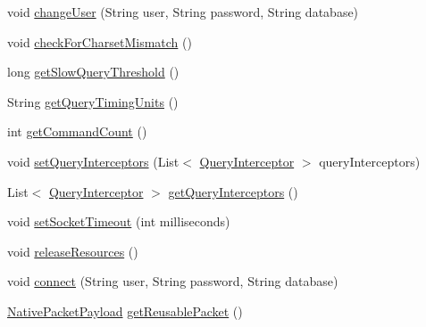 \begin{DoxyCompactItemize}
\item 
void \mbox{\hyperlink{classcom_1_1mysql_1_1cj_1_1protocol_1_1a_1_1_native_protocol_a7f356b98ad856e135cfbdcae35d87009}{change\+User}} (String user, String password, String database)
\item 
void \mbox{\hyperlink{classcom_1_1mysql_1_1cj_1_1protocol_1_1a_1_1_native_protocol_a08c79e079662813e512c6fe30cfb5fdd}{check\+For\+Charset\+Mismatch}} ()
\item 
long \mbox{\hyperlink{classcom_1_1mysql_1_1cj_1_1protocol_1_1a_1_1_native_protocol_a6cea7c094360051de8781b7fe2ea87ae}{get\+Slow\+Query\+Threshold}} ()
\item 
String \mbox{\hyperlink{classcom_1_1mysql_1_1cj_1_1protocol_1_1a_1_1_native_protocol_a64f116119e9dc3ab702d1b15e4a18c54}{get\+Query\+Timing\+Units}} ()
\item 
int \mbox{\hyperlink{classcom_1_1mysql_1_1cj_1_1protocol_1_1a_1_1_native_protocol_ad6bcb856be81eab8d103631d4479dfc8}{get\+Command\+Count}} ()
\item 
void \mbox{\hyperlink{classcom_1_1mysql_1_1cj_1_1protocol_1_1a_1_1_native_protocol_ac90258dbc58a891639d6a2c15c77de67}{set\+Query\+Interceptors}} (List$<$ \mbox{\hyperlink{interfacecom_1_1mysql_1_1cj_1_1interceptors_1_1_query_interceptor}{Query\+Interceptor}} $>$ query\+Interceptors)
\item 
List$<$ \mbox{\hyperlink{interfacecom_1_1mysql_1_1cj_1_1interceptors_1_1_query_interceptor}{Query\+Interceptor}} $>$ \mbox{\hyperlink{classcom_1_1mysql_1_1cj_1_1protocol_1_1a_1_1_native_protocol_ad86ce2b8286a798c9408508217fb908b}{get\+Query\+Interceptors}} ()
\item 
void \mbox{\hyperlink{classcom_1_1mysql_1_1cj_1_1protocol_1_1a_1_1_native_protocol_ab6cb784afa306e310da731783c3ff602}{set\+Socket\+Timeout}} (int milliseconds)
\item 
void \mbox{\hyperlink{classcom_1_1mysql_1_1cj_1_1protocol_1_1a_1_1_native_protocol_a1466aafc5b09d27d6df89546954154d7}{release\+Resources}} ()
\item 
void \mbox{\hyperlink{classcom_1_1mysql_1_1cj_1_1protocol_1_1a_1_1_native_protocol_ad567528560d84a107a288dd1c08fb9ce}{connect}} (String user, String password, String database)
\item 
\mbox{\hyperlink{classcom_1_1mysql_1_1cj_1_1protocol_1_1a_1_1_native_packet_payload}{Native\+Packet\+Payload}} \mbox{\hyperlink{classcom_1_1mysql_1_1cj_1_1protocol_1_1a_1_1_native_protocol_a0740b0da6d971cff9f66cfd9e4414511}{get\+Reusable\+Packet}} ()
\item 

\end{DoxyCompactItemize}
